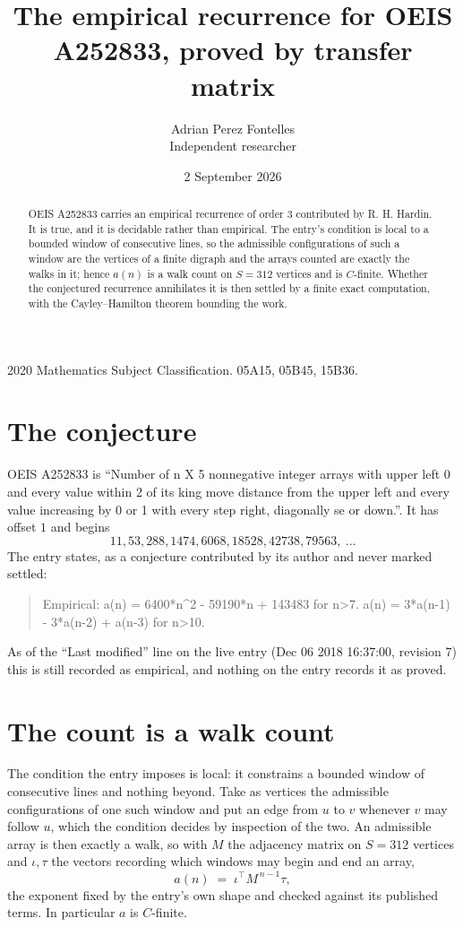 \documentclass[11pt,a4paper]{article}
\title{The empirical recurrence for OEIS A252833, proved by transfer matrix}
\author{Adrian Perez Fontelles\\ \small Independent researcher}
\date{2 September 2026}
\theoremstyle{plain}
\theoremstyle{definition}
\begin{document}
\maketitle

\begin{abstract}
OEIS A252833 carries an empirical recurrence of order $3$ contributed by R. H. Hardin. It is
true, and it is decidable rather than empirical. The entry's condition is local to a bounded window of consecutive lines, so
the admissible configurations of such a window are the vertices of a finite digraph and the
arrays counted are exactly the walks in it; hence $a(n)$ is a walk count on $S=312$ vertices
and is $C$-finite. Whether the conjectured recurrence annihilates it is then settled by a
finite exact computation, with the Cayley--Hamilton theorem bounding the work.
\end{abstract}

\noindent\small 2020 Mathematics Subject Classification. 05A15, 05B45, 15B36.\normalsize

\section{The conjecture}

OEIS A252833 is ``Number of n X 5 nonnegative integer arrays with upper left 0 and every value within 2 of its king move distance from the upper left and every value increasing by 0 or 1 with every step right, diagonally se or down.''. It has offset $1$ and begins
\[
11, 53, 288, 1474, 6068, 18528, 42738, 79563,\ \dots
\]
The entry states, as a conjecture contributed by its author and never marked settled:
\begin{quote}
Empirical: a(n) = 6400*n\^{}2 - 59190*n + 143483 for n>7. a(n) = 3*a(n-1) - 3*a(n-2) + a(n-3) for n>10.
\end{quote}
As of the ``Last modified'' line on the live entry (Dec 06 2018 16:37:00, revision 7) this is still
recorded as empirical, and nothing on the entry records it as proved.

\section{The count is a walk count}

The condition the entry imposes is local: it constrains a bounded window of consecutive lines and nothing beyond. Take as
vertices the admissible configurations of one such window and put an edge from $u$ to $v$
whenever $v$ may follow $u$, which the condition decides by inspection of the two. An
admissible array is then exactly a walk, so with $M$ the adjacency matrix on $S=312$ vertices
and $\iota,\tau$ the vectors recording which windows may begin and end an array,
\[
a(n)\;=\;\iota^{\!\top}M^{\,n-1}\tau ,
\]
the exponent fixed by the entry's own shape and checked against its published terms. In
particular $a$ is $C$-finite.
\end{document}
